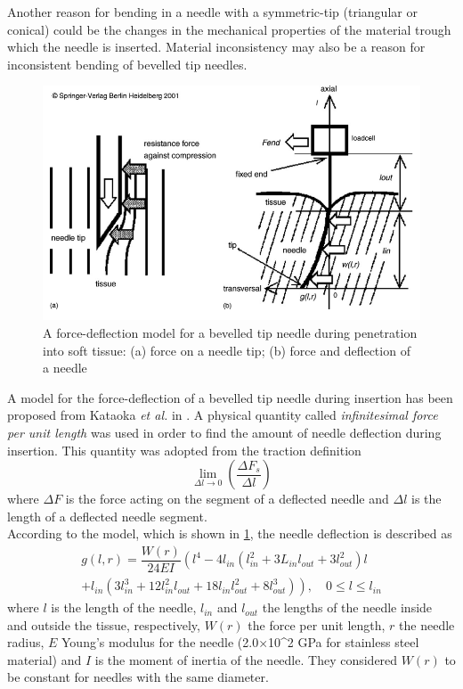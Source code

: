 Another reason for bending in a needle with a symmetric-tip (triangular or conical) could be the changes in the mechanical properties of the material trough which the needle is inserted. Material inconsistency may also be a reason for inconsistent bending of bevelled tip needles.
\begin{figure}
	\includegraphics[width=\textwidth]{images/kataoka_model.png}
	\caption[Needle bending model]{A force-deflection model for a bevelled tip needle during penetration into soft tissue: (a) force on a needle tip; (b) force and deflection of a needle \cite{katakoa2001}}
	\label{fig:kataoka_model}
\end{figure}

A model for the force-deflection of a bevelled tip needle during insertion has been proposed from Kataoka \textit{et al.} in \cite{katakoa2001}.
A physical quantity called \textit{infinitesimal force per unit length} was used in order to find the amount of needle deflection during insertion.
This quantity was adopted from the traction definition \[\lim_{\Delta l \rightarrow0}\left(  \dfrac{\Delta F_{s}}{\Delta l}\right) \] where $\Delta F$ is the force acting on the segment of a deflected needle and $\Delta l$ is the length of a deflected needle segment.\\
According to the model, which is shown in \figurename{ \ref{fig:kataoka_model}}, the needle deflection is described as
\begin{multline}
		g\left( l,r \right)  = \dfrac{W\left( r \right) }{24EI} \left( l^{4} -4l_{in}\left( l^{2}_{in} + 3L_{in} l_{out} +3l^{2}_{out}\right)l\right.  \\\left.  + l_{in} \left( 3l^{3}_{in} + 12l^{2}_{in}l_{out} + 18l_{in}l^{2}_{out} + 8l^{3}_{out} \right) \right), \quad 0 \leq l \leq l_{in}
		\label{Eq:Neddle_deflection}
\end{multline}
where $l$ is the length of the needle, $l_{in}$ and $l_{out}$ the lengths of the needle inside and outside the tissue, respectively, $W(r)$ the force per unit length, $r$ the needle radius, $E$ Young’s modulus for the needle (2.0×10^{2} GPa for stainless steel material) and $I$ is the moment of inertia of the needle.
They considered $W(r)$ to be constant for needles with the same diameter.

